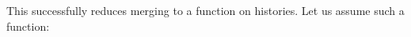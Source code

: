 This successfully reduces merging to a function on histories. Let us assume such a function:
\begin{code}%
\>[0][@{}l@{\AgdaIndent{1}}]%
\>[2]\AgdaSpace{}%
\AgdaSymbol{:}%
\>[804I]\AgdaSymbol{\{}\AgdaSpace{}%
\AgdaSpace{}%
\AgdaSymbol{:}\AgdaSpace{}%
\AgdaSymbol{\}}\AgdaSpace{}%
\<%
\\
\>[.][@{}l@{}]\<[804I]%
\>[11]\AgdaSymbol{(}\AgdaSpace{}%
\AgdaSymbol{:}\AgdaSpace{}%
\AgdaSpace{}%
\AgdaSpace{}%
\AgdaSymbol{)}\AgdaSpace{}%
\AgdaSymbol{(}\AgdaSpace{}%
\AgdaSymbol{:}\AgdaSpace{}%
\AgdaSpace{}%
\AgdaSpace{}%
\AgdaSymbol{)}\AgdaSpace{}%
\<%
\\
%
\>[11]\AgdaFunction{Σ[}\AgdaSpace{}%
\AgdaSpace{}%
\AgdaSpace{}%
\AgdaSpace{}%
\AgdaFunction{]}\AgdaSpace{}%
\AgdaSymbol{(}\AgdaFunction{Σ[}\AgdaSpace{}%
\AgdaSpace{}%
\AgdaSpace{}%
\AgdaSpace{}%
\AgdaSpace{}%
\AgdaSpace{}%
\AgdaFunction{]}\AgdaSpace{}%
\AgdaSymbol{(}\AgdaSpace{}%
\AgdaSpace{}%
\AgdaSpace{}%
\AgdaSpace{}%
\AgdaSpace{}%
\AgdaSpace{}%
\AgdaSymbol{))}\<%
\end{code}
\begin{code}[hide]%
%
\>[2]\AgdaSymbol{\}}\AgdaSpace{}%
\<%
\end{code}

